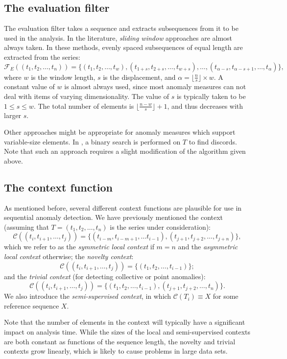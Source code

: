\subsection{The evaluation filter}

The evaluation filter takes a sequence and extracts subsequences from it to be used in the analysis. In the literature, \emph{sliding window} approaches are almost always taken. In these methods, evenly spaced subsequences of equal length are extracted from the series:
\[
  \mathcal{F}_E((t_1, t_2, \dots, t_n)) = \{(t_1, t_2, \dots, t_w), (t_{1 + s}, t_{2+s}, \dots, t_{w+s}), \dots, (t_{\alpha-s}, t_{\alpha-s+1}, \dots, t_{\alpha})\},
\]
where $w$ is the window length, $s$ is the displacement, and $\alpha = \lfloor \frac{n}{s} \rfloor \times w$. A constant value of $w$ is almost always used, since most anomaly measures can not deal with items of varying dimensionality. The value of $s$ is typically taken to be $1 \leq s \leq w$. The total number of elements is $\lfloor \frac{n-w}{s} \rfloor + 1$, and thus decreases with larger $s$.

Other approaches might be appropriate for anomaly measures which support variable-size elements. In \cite{keogh2}, a binary search is performed on $T$ to find discords. Note that such an approach requires a slight modification of the algorithm given above.

\subsection{The context function}
As mentioned before, several different context functions are plausible for use in sequential anomaly detection. We have previously mentioned the context (assuming that $T = (t_1, t_2, \dots, t_n)$ is the series under consideration):
\[ 
    \mathcal{C}((t_i, t_{i+1}, \dots, t_j)) = \{ (t_{i-m}, t_{i-m+1}, \dots t_{i-1}), (t_{j+1}, t_{j+2}, \dots, t_{j+n}) \},
\]
which we refer to as the \emph{symmetric local context} if $m = n$ and the \emph{asymmetric local context} otherwise; the \emph{novelty context}:
\[
    \mathcal{C}((t_i, t_{i+1}, \dots, t_j)) = \{ (t_1, t_2, \dots, t_{i-1}) \};
\]
and the \emph{trivial context} (for detecting collective or point anomalies):
\[
    \mathcal{C}((t_i, t_{i+1}, \dots, t_j)) = \{ (t_1, t_2, \dots, t_{i-1}), (t_{j+1}, t_{j+2}, \dots, t_n) \}.
\]
We also introduce the \emph{semi-supervised context}, in which $\mathcal{C}(T_i) \equiv X$ for some reference sequence $X$.

Note that the number of elements in the context will typically have a significant impact on analysis time. While the sizes of the local and semi-supervised contexts are both constant as functions of the sequence length, the novelty and trivial contexts grow linearly, which is likely to cause problems in large data sets.

